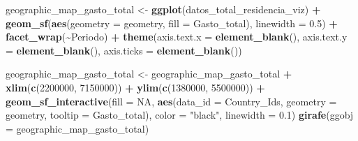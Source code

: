 \documentclass[data,article,submit,moreauthors,pdftex]{Definitions/mdpi}
\newenvironment{Shaded}{\begin{snugshade}}{\end{snugshade}}
\newcommand{\AttributeTok}[1]{\textcolor[rgb]{0.13,0.29,0.53}{#1}}
\newcommand{\ConstantTok}[1]{\textcolor[rgb]{0.56,0.35,0.01}{#1}}
\newcommand{\DecValTok}[1]{\textcolor[rgb]{0.00,0.00,0.81}{#1}}
\newcommand{\FloatTok}[1]{\textcolor[rgb]{0.00,0.00,0.81}{#1}}
\newcommand{\FunctionTok}[1]{\textcolor[rgb]{0.13,0.29,0.53}{\textbf{#1}}}
\newcommand{\NormalTok}[1]{#1}
\newcommand{\OtherTok}[1]{\textcolor[rgb]{0.56,0.35,0.01}{#1}}
\newcommand{\SpecialCharTok}[1]{\textcolor[rgb]{0.81,0.36,0.00}{\textbf{#1}}}
\newcommand{\StringTok}[1]{\textcolor[rgb]{0.31,0.60,0.02}{#1}}
\begin{document}
\begin{Shaded}
\begin{Highlighting}[]
\NormalTok{geographic\_map\_gasto\_total }\OtherTok{\textless{}{-}} \FunctionTok{ggplot}\NormalTok{(datos\_total\_residencia\_viz) }\SpecialCharTok{+}
    \FunctionTok{geom\_sf}\NormalTok{(}\FunctionTok{aes}\NormalTok{(}\AttributeTok{geometry =}\NormalTok{ geometry, }\AttributeTok{fill =}\NormalTok{ Gasto\_total), }\AttributeTok{linewidth =} \FloatTok{0.5}\NormalTok{) }\SpecialCharTok{+}
    \FunctionTok{facet\_wrap}\NormalTok{(}\SpecialCharTok{\textasciitilde{}}\NormalTok{Periodo) }\SpecialCharTok{+} \FunctionTok{theme}\NormalTok{(}\AttributeTok{axis.text.x =} \FunctionTok{element\_blank}\NormalTok{(),}
    \AttributeTok{axis.text.y =} \FunctionTok{element\_blank}\NormalTok{(), }\AttributeTok{axis.ticks =} \FunctionTok{element\_blank}\NormalTok{())}

\NormalTok{geographic\_map\_gasto\_total }\OtherTok{\textless{}{-}}\NormalTok{ geographic\_map\_gasto\_total }\SpecialCharTok{+} \FunctionTok{xlim}\NormalTok{(}\FunctionTok{c}\NormalTok{(}\DecValTok{2200000}\NormalTok{,}
    \DecValTok{7150000}\NormalTok{)) }\SpecialCharTok{+} \FunctionTok{ylim}\NormalTok{(}\FunctionTok{c}\NormalTok{(}\DecValTok{1380000}\NormalTok{, }\DecValTok{5500000}\NormalTok{)) }\SpecialCharTok{+} \FunctionTok{geom\_sf\_interactive}\NormalTok{(}\AttributeTok{fill =} \ConstantTok{NA}\NormalTok{,}
    \FunctionTok{aes}\NormalTok{(}\AttributeTok{data\_id =}\NormalTok{ Country\_Ids, }\AttributeTok{geometry =}\NormalTok{ geometry, }\AttributeTok{tooltip =}\NormalTok{ Gasto\_total),}
    \AttributeTok{color =} \StringTok{"black"}\NormalTok{, }\AttributeTok{linewidth =} \FloatTok{0.1}\NormalTok{)}
\FunctionTok{girafe}\NormalTok{(}\AttributeTok{ggobj =}\NormalTok{ geographic\_map\_gasto\_total)}
\end{Highlighting}
\end{Shaded}
\end{document}
